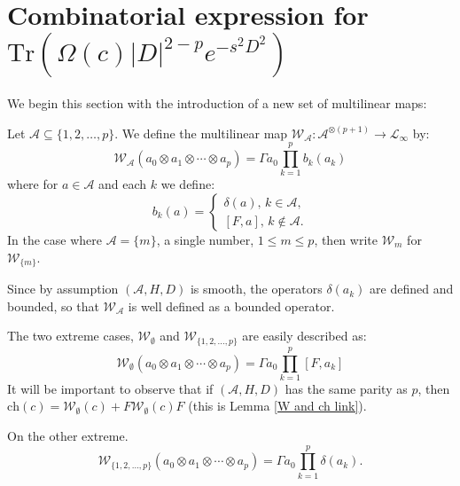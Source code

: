 \section[Combinatorial expression]{Combinatorial expression for $\mathrm{Tr}(\Omega(c)|D|^{2-p}e^{-s^2D^2})$}\label{combinatorial section}
    We begin this section with the introduction of a new set of multilinear maps:
    \begin{defi}\label{W definition}
        Let $\mathscr{A} \subseteq \{1,2,\ldots,p\}$. We define the multilinear map $\mathcal{W}_\mathscr{A}:\mathcal{A}^{\otimes(p+1)}\to \mathcal{L}_{\infty}$ by:
        \begin{equation*}
            \mathcal{W}_{\mathscr{A}}(a_0\otimes a_1\otimes\cdots\otimes a_p) = \Gamma a_0\prod_{k=1}^p b_k(a_k)
        \end{equation*}
        where for $a \in \mathcal{A}$ and each $k$ we define:
        \begin{equation*}
            b_k(a) = \begin{cases}
                            \delta(a),\,k \in \mathscr{A},\\
                            [F,a],\,k \notin \mathscr{A}.
                       \end{cases}
        \end{equation*} 
        In the case where $\mathscr{A} = \{m\}$, a single number, $1 \leq m \leq p$, then write $\mathcal{W}_m$ for $\mathcal{W}_{\{m\}}$.
    \end{defi}
    Since by assumption $(\mathcal{A},H,D)$ is smooth, the operators $\delta(a_k)$ are defined and bounded, so that $\mathcal{W}_{\mathscr{A}}$ is well defined as a bounded operator.
    
    The two extreme cases, $\mathcal{W}_{\emptyset}$ and $\mathcal{W}_{\{1,2,\ldots,p\}}$ are easily described as:
    \begin{equation*}
        \mathcal{W}_{\emptyset}(a_0\otimes a_1\otimes\cdots\otimes a_p) = \Gamma a_0\prod_{k=1}^p [F,a_k]
    \end{equation*}
    It will be important to observe that if $(\mathcal{A},H,D)$ has the same parity as $p$, then $\mathrm{ch}(c) = \mathcal{W}_{\emptyset}(c)+F\mathcal{W}_{\emptyset}(c)F$ (this is Lemma \ref{W and ch link}).
    
    On the other extreme.
    \begin{equation*}
        \mathcal{W}_{\{1,2,\ldots,p\}}(a_0\otimes a_1\otimes\cdots\otimes a_p) = \Gamma a_0\prod_{k=1}^p\delta(a_k).
    \end{equation*}
        
